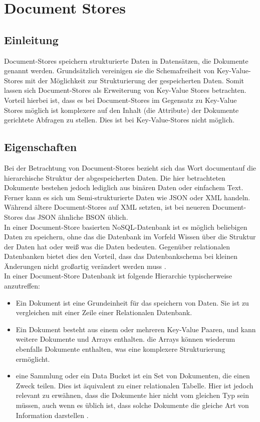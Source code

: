 \section{Document Stores}
\subsection{Einleitung}
Document-Stores speichern strukturierte Daten in Datensätzen, die Dokumente genannt werden. Grundsätzlich vereinigen sie die Schemafreiheit von Key-Value-Stores mit der Möglichkeit zur Strukturierung der gespeicherten Daten. Somit lassen sich Document-Stores als Erweiterung von Key-Value Stores betrachten. Vorteil hierbei ist, dass es bei Document-Stores im Gegensatz zu Key-Value Stores möglich ist komplexere auf den Inhalt (die Attribute) der Dokumente gerichtete Abfragen zu stellen. Dies ist bei Key-Value-Stores nicht möglich.

\subsection{Eigenschaften}
Bei der Betrachtung von Document-Stores bezieht sich das Wort \grqq document\grqq auf die hierarchische Struktur der abgespeicherten Daten. Die hier betrachteten Dokumente bestehen jedoch lediglich aus binären Daten oder einfachem Text. Ferner kann es sich um Semi-strukturierte Daten wie JSON oder XML handeln. Während ältere Document-Stores auf XML setzten, ist bei neueren Document-Stores das JSON ähnliche BSON üblich. 
\\

In einer Document-Store basierten NoSQL-Datenbank ist es möglich beliebigen Daten zu speichern, ohne das die Datenbank im Vorfeld Wissen über die Struktur der Daten hat oder weiß was die Daten bedeuten. Gegenüber relationalen Datenbanken bietet dies den Vorteil, dass das Datenbankschema bei kleinen Änderungen nicht großartig verändert werden muss \cite{harrison01}. 
\\

In einer Document-Store Datenbank ist folgende Hierarchie typischerweise anzutreffen:
\begin{itemize}
\item Ein Dokument ist eine Grundeinheit für das speichern von Daten. Sie ist zu vergleichen mit einer Zeile einer Relationalen Datenbank.
\item Ein Dokument besteht aus einem oder mehreren Key-Value Paaren, und kann weitere Dokumente und Arrays enthalten. die Arrays können wiederum ebenfalls Dokumente enthalten, was eine komplexere Strukturierung ermöglicht.
\item eine Sammlung oder ein Data Bucket ist ein Set von Dokumenten, die einen Zweck teilen. Dies ist äquivalent zu einer relationalen Tabelle. Hier ist jedoch relevant zu erwähnen, dass die Dokumente hier nicht vom gleichen Typ sein müssen, auch wenn es üblich ist, dass solche Dokumente die gleiche Art von Information darstellen \cite{harrison01}.
\end{itemize}

